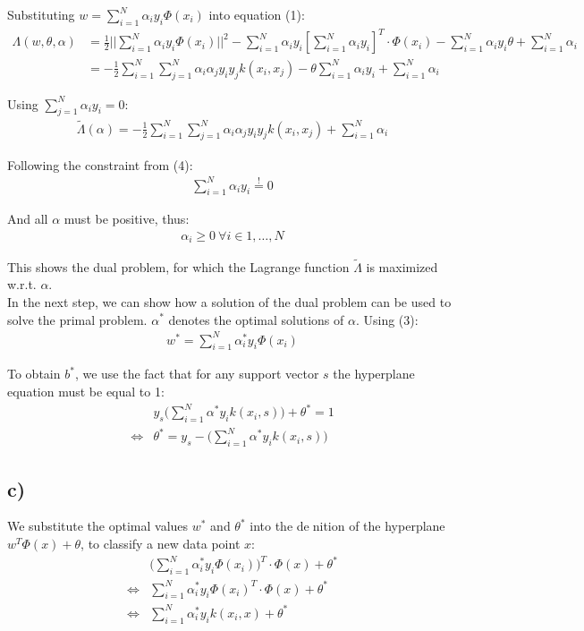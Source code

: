 \documentclass{article}
\begin{document}
Substituting $w = \sum_{i=1}^N \alpha_i y_i \Phi(x_i)$ into equation (1):
\begin{align}
    \Lambda(w,\theta,\alpha) &= \frac{1}{2} \bigg|\bigg|{\sum_{i=1}^N \alpha_i y_i \Phi(x_i)}\bigg|\bigg|^2 - \sum_{i=1}^N \alpha_i y_i[\sum_{i=1}^N \alpha_i y_i]^T \cdot \Phi(x_i) - \sum_{i=1}^N \alpha_i y_i \theta + \sum_{i=1}^N \alpha_i \\
    &= -\frac{1}{2} \sum_{i=1}^N \sum_{j=1}^N \alpha_i \alpha_j y_i y_j k(x_i, x_j) - \theta \sum_{i=1}^N \alpha_i y_i + \sum_{i=1}^N \alpha_i ~~~~~~~~~~~~~~~
\end{align}

Using $\sum_{j=1}^N \alpha_i y_i = 0$: 
\begin{align}
    \tilde{\Lambda}(\alpha) = - \frac{1}{2}  \sum_{i=1}^N \sum_{j=1}^N \alpha_i \alpha_j y_i y_j k(x_i, x_j) + \sum_{i=1}^N \alpha_i
\end{align}

Following the constraint from (4):
\begin{align}
    \sum_{i=1}^N \alpha_i y_i \stackrel{!}{=} 0
\end{align}

And all $\alpha$ must be positive, thus:
\begin{align}
    \alpha_i \geq 0 \ \forall i \in 1, \dots, N
\end{align}

This shows the dual problem, for which the Lagrange function $\tilde{\Lambda}$ is maximized w.r.t. $\alpha$. \\

In the next step, we can show how a solution of the dual problem can be used to solve the primal problem. $\alpha^\ast$ denotes the optimal solutions of $\alpha$. Using (3):
\begin{align}
    w^\ast = \sum_{i=1}^N \alpha_i^\ast y_i \Phi(x_i)
\end{align}

To obtain $b^\ast$, we use the fact that for any support vector $s$ the hyperplane equation must be equal to 1:
\begin{align}
    &y_s \bigg(\sum_{i=1}^N \alpha^\ast y_i k(x_i, s) \bigg) + \theta^\ast = 1 \\
    \Longleftrightarrow &\theta^\ast = y_s - \bigg( \sum_{i=1}^N \alpha^\ast y_i k(x_i, s) \bigg)
\end{align}

\subsection*{c)}
We substitute the optimal values $w^\ast$ and $\theta^\ast$
into the denition of the hyperplane $w^T\Phi(x)+ \theta$, to classify a new data point $x$:
\begin{align}
&\bigg(\sum \limits _{i=1}^{N}\alpha_i^\ast y_i \Phi(x_i)\bigg)^T\cdot\Phi(x)+\theta^\ast\\
\Longleftrightarrow &\sum \limits _{i=1}^{N}\alpha_i^\ast y_i \Phi(x_i)^T\cdot\Phi(x)+\theta^\ast\\
\Longleftrightarrow &\sum \limits _{i=1}^{N}\alpha_i^\ast y_i k(x_i,x)+\theta^\ast
\end{align}
\end{document}
